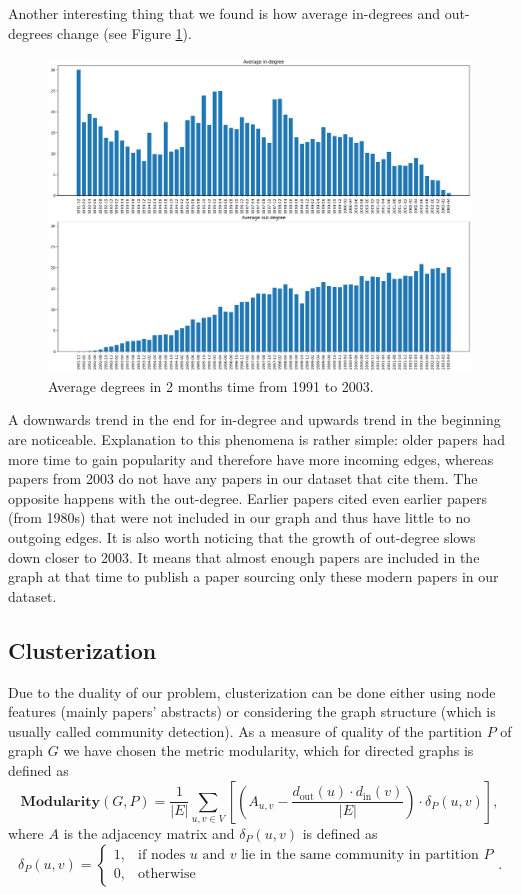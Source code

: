 \documentclass{article}
\begin{document}
Another interesting thing that we found is how average in-degrees and out-degrees change (see Figure \ref{plot:average_degree_per_month}).
\begin{figure}[h]
\centering
\includegraphics[width=1\linewidth]{degrees_over_time.png}
\caption{Average degrees in 2 months time from 1991 to 2003.} \label{plot:average_degree_per_month}
\end{figure}
A downwards trend in the end for in-degree and upwards trend in the beginning are noticeable. Explanation to this phenomena is rather simple: older papers had more time to gain popularity and therefore have more incoming edges, whereas papers from 2003 do not have any papers in our dataset that cite them. The opposite happens with the out-degree. Earlier papers cited even earlier papers (from 1980s) that were not included in our graph and thus have little to no outgoing edges. It is also worth noticing that the growth of out-degree slows down closer to 2003. It means that almost enough papers are included in the graph at that time to publish a paper sourcing only these modern papers in our dataset.

\subsection{Clusterization}
Due to the duality of our problem, clusterization can be done either using node features (mainly papers' abstracts) or considering the graph structure (which is usually called community detection). As a measure of quality of the partition $P$ of graph $G$ we have chosen the metric modularity, which for directed graphs is defined as
$$\textbf{Modularity}(G, P) = \frac{1}{|E|} \sum_{u, v \in V} \left[\left(A_{u, v} - \frac{d_{\text{out}}(u)\cdot d_{\text{in}}(v)}{|E|}\right)\cdot \delta_P(u, v)\right],$$
where $A$  is the adjacency matrix and $\delta_P(u, v)$ is defined as
$$\delta_P(u, v) =
\begin{cases}
1, & \text{if nodes } u \text{ and } v \text{ lie in the same community in partition } P \\
0, & \text{otherwise}
\end{cases}.
$$ 
\end{document}
